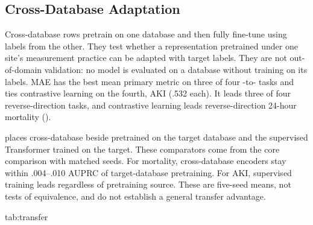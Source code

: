 \begin{table}[htbp]
{\scriptsize}
\end{table}

\begin{table}[htbp]
{\scriptsize}
\end{table}

\subsection{Cross-Database Adaptation}
\label{app:transfer}

Cross-database rows pretrain on one database and then fully fine-tune using labels from the other. They test whether a representation pretrained under one site's measurement practice can be adapted with target labels. They are not out-of-domain validation: no model is evaluated on a database without training on its labels. MAE has the best mean primary metric on three of four \MIMIC{}-to-\EICU{} tasks and ties contrastive learning on the fourth, AKI (.532 each). It leads three of four reverse-direction tasks, and contrastive learning leads reverse-direction 24-hour mortality ().

 places cross-database \MAE{} beside \MAE{} pretrained on the target database and the supervised Transformer trained on the target. These comparators come from the core comparison with matched seeds. For mortality, cross-database encoders stay within .004--.010 AUPRC of target-database pretraining. For AKI, supervised training leads regardless of pretraining source. These are five-seed means, not tests of equivalence, and do not establish a general transfer advantage.

\begin{table}[htbp]
\floatconts
  {tab:transfer}
  {\caption{Cross-database full-fine-tuning means over five seeds. Classification uses AUPRC. LOS uses absolute error in days. Bold marks the best mean within each row, and every mean that ties it at three decimals.}}
  {\scriptsize
  }
\end{table}

